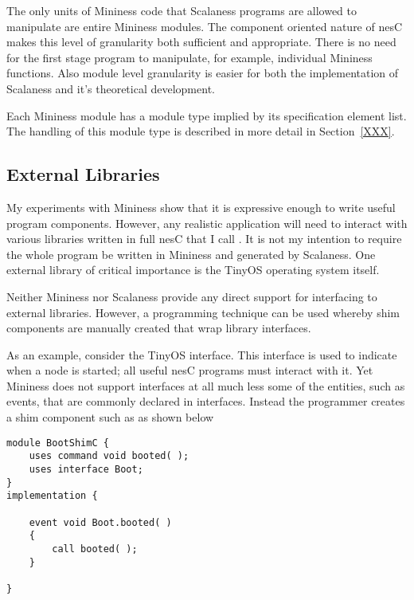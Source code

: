 The only units of Mininess code that Scalaness programs are allowed to manipulate are entire
Mininess modules. The component oriented nature of nesC makes this level of granularity both
sufficient and appropriate. There is no need for the first stage program to manipulate, for
example, individual Mininess functions. Also module level granularity is easier for both the
implementation of Scalaness and it's theoretical development.

Each Mininess module has a module type implied by its specification element list. The handling
of this module type is described in more detail in Section~\ref{XXX}.

\subsection{External Libraries}
\label{sec:external-libraries-design}

My experiments with Mininess show that it is expressive enough to write useful program
components. However, any realistic application will need to interact with various libraries
written in full nesC that I call . It is not my intention to require
the whole program be written in Mininess and generated by Scalaness. One external library of
critical importance is the TinyOS operating system itself.

Neither Mininess nor Scalaness provide any direct support for interfacing to external libraries.
However, a programming technique can be used whereby shim components are manually created that
wrap library interfaces.

As an example, consider the TinyOS  interface. This interface is used to
indicate when a node is started; all useful nesC programs must interact with it. Yet Mininess
does not support interfaces at all much less some of the entities, such as events, that are
commonly declared in interfaces. Instead the programmer creates a shim component such as
 as shown below

\singlespace
\vspace{1.0ex}
\begin{lstlisting}[language=nesC]
module BootShimC {
    uses command void booted( );
    uses interface Boot;
}
implementation {
    
    event void Boot.booted( )
    {
        call booted( );
    }
    
}
\end{lstlisting}
\vspace{1.0ex}
\primaryspacing

